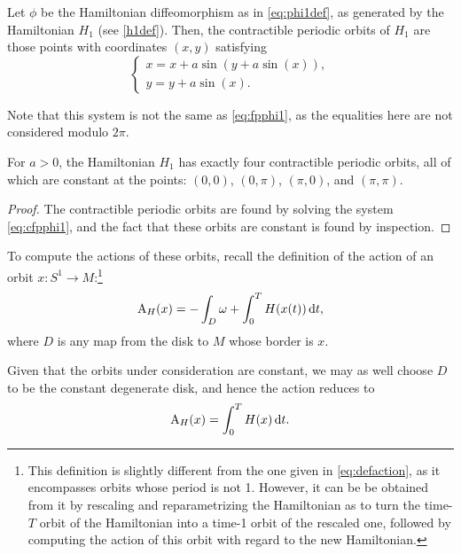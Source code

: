 \begin{corollary}
Let $\phi$ be the Hamiltonian diffeomorphism as in \eqref{eq:phi1def}, as generated by the Hamiltonian $H_1$ (see \eqref{h1def}). Then, the contractible periodic orbits of $H_1$	 are those points with coordinates $(x,y)$ satisfying
\begin{equation}\label{eq:cfpphi1}
\begin{cases}
x = x + a \sin(y + a \sin(x)),\\
y = y + a \sin(x).
\end{cases}
\end{equation}

Note that this system is not the same as \eqref{eq:fpphi1}, as the equalities here are not considered modulo $2\pi$.	
\end{corollary}

\begin{prop}
For $a > 0$, the Hamiltonian $H_1$ has exactly four contractible periodic orbits, all of which are constant at the points: $(0,0)$, $(0,\pi)$, $(\pi,0)$, and $(\pi,\pi)$.
\end{prop}

\begin{proof}
The contractible periodic orbits are found by solving the system \eqref{eq:cfpphi1}, and the fact that these orbits are constant is found by inspection.
\end{proof}

To compute the actions of these orbits, recall the definition of the action of an orbit $x \colon S^1 \to M$:\footnote{This definition is slightly different from the one given in \eqref{eq:defaction}, as it encompasses orbits whose period is not 1. However, it can be be obtained from it by rescaling and reparametrizing the Hamiltonian as to turn the time-$T$ orbit of the Hamiltonian into a time-1 orbit of the rescaled one, followed by computing the action of this orbit with regard to the new Hamiltonian.}
\begin{equation}
\AA_{H}(x) = - \int_D \omega + \int_0^T H(x(t)) \dl t,
\end{equation}
where $D$ is any map from the disk to $M$ whose border is $x$.

Given that the orbits under consideration are constant, we may as well choose $D$ to be the constant degenerate disk, and hence the action reduces to
\begin{equation}
\AA_H(x) = \int_0^T H(x) \dl t.
\end{equation}

